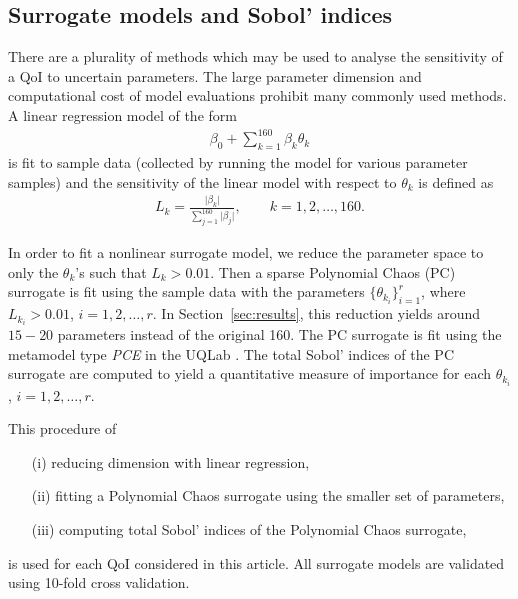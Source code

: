 \subsection{Surrogate models and Sobol' indices}
There are a plurality of methods which may be used to analyse the sensitivity of a QoI to uncertain parameters. The large parameter dimension and computational cost of model evaluations prohibit many commonly used methods. A linear regression model of the form
\begin{eqnarray*}
\beta_0 + \sum\limits_{k=1}^{160} \beta_k \theta_k
\end{eqnarray*}
is fit to sample data (collected by running the model for various parameter samples) and the sensitivity of the linear model with respect to $\theta_k$ is defined as
\begin{eqnarray*}
L_k = \frac{\vert \beta_k \vert}{\sum\limits_{j=1}^{160} \vert \beta_j \vert}, \qquad k=1,2,\dots,160.
\end{eqnarray*}

In order to fit a nonlinear surrogate model, we reduce the parameter space to only the $\theta_k$'s such that $L_k>0.01$. Then a sparse Polynomial Chaos (PC) surrogate is fit using the sample data with the parameters $\{\theta_{k_i}\}_{i=1}^r$, where $L_{k_i}>0.01$, $i=1,2,\dots,r$. In Section~\ref{sec:results}, this reduction yields around $15-20$ parameters instead of the original 160. The PC surrogate is fit using the metamodel type \textit{PCE} in the UQLab \cite{uqlab}. The total Sobol' indices \cite{saltellitotalindex} of the PC surrogate are computed to yield a quantitative measure of importance for each $\theta_{k_i}$, $i=1,2,\dots,r$.

This procedure of 
\begin{enumerate}
\item[(i)] reducing dimension with linear regression,
\item[(ii)] fitting a Polynomial Chaos surrogate using the smaller set of parameters,
\item[(iii)] computing total Sobol' indices of the Polynomial Chaos surrogate,
\end{enumerate}
is used for each QoI considered in this article. All surrogate models are validated using 10-fold cross validation.
